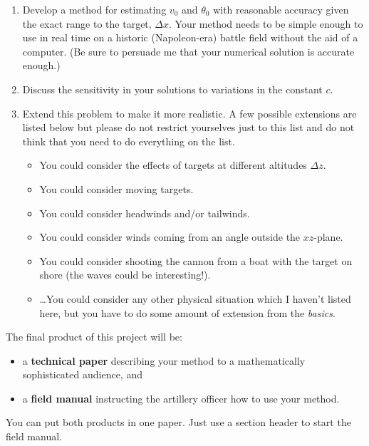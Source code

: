 \documentclass[
]{book}
\theoremstyle{definition}
\theoremstyle{definition}
\theoremstyle{definition}
\theoremstyle{remark}
\begin{document}
\begin{enumerate}
\def\labelenumi{\alph{enumi}.}
\item
  Develop a method for estimating \(v_0\) and \(\theta_0\) with reasonable
  accuracy given the exact range to the target, \(\Delta x\). Your method needs to be simple enough
  to use in real time on a historic (Napoleon-era) battle field
  without the aid of a computer. (Be sure to persuade me that your
  numerical solution is accurate enough.)
\item
  Discuss the sensitivity in your solutions to variations in the
  constant \(c\).
\item
  Extend this problem to make it more realistic. A few possible
  extensions are listed below but please do not restrict yourselves
  just to this list and do not think that you need to do everything on
  the list.

  \begin{itemize}
  \item
    You could consider the effects of targets at different altitudes
    \(\Delta z\).
  \item
    You could consider moving targets.
  \item
    You could consider headwinds and/or tailwinds.
  \item
    You could consider winds coming from an angle outside the
    \(xz\)-plane.
  \item
    You could consider shooting the cannon from a boat with the
    target on shore (the waves could be interesting!).
  \item
    \ldots You could consider any other physical situation which I
    haven't listed here, but you have to do some amount of extension
    from the \emph{basics}.
  \end{itemize}
\end{enumerate}

The final product of this project will be:

\begin{itemize}
\item
  a \textbf{technical paper} describing your method to a mathematically
  sophisticated audience, and
\item
  a \textbf{field manual} instructing the artillery officer how to use your
  method.
\end{itemize}

You can put both products in one paper. Just use a section header to
start the field manual.
\end{document}
